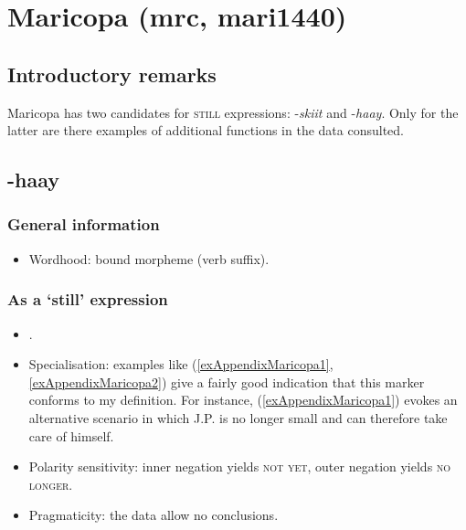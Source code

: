 \section{Maricopa (mrc, mari1440)}
\subsection{Introductory remarks}
Maricopa has two candidates for \textsc{still} expressions: \mbox{-\textit{skiit}} and \mbox{-\textit{haay}}. Only for the latter are there examples of additional functions in the data consulted.

\subsection{-haay}

\subsubsection{General information}
\begin{itemize}
	\item Wordhood: bound morpheme (verb suffix).
\end{itemize}

\subsubsection{As a \lq{}still\rq{ }expression}
\begin{itemize}
	\item \textcite[142–145]{Gordon1986}.
	\item Specialisation: examples like (\ref{exAppendixMaricopa1}, \ref{exAppendixMaricopa2}) give a fairly good indication that this marker conforms to my definition. For instance, (\ref{exAppendixMaricopa1}) evokes an alternative scenario in which J.P. is no longer small and can therefore take care of himself.
	\item Polarity sensitivity: inner negation yields \textsc{not yet}, outer negation yields \textsc{no longer}.
	\item Pragmaticity: the data allow no conclusions.
\end{itemize}

